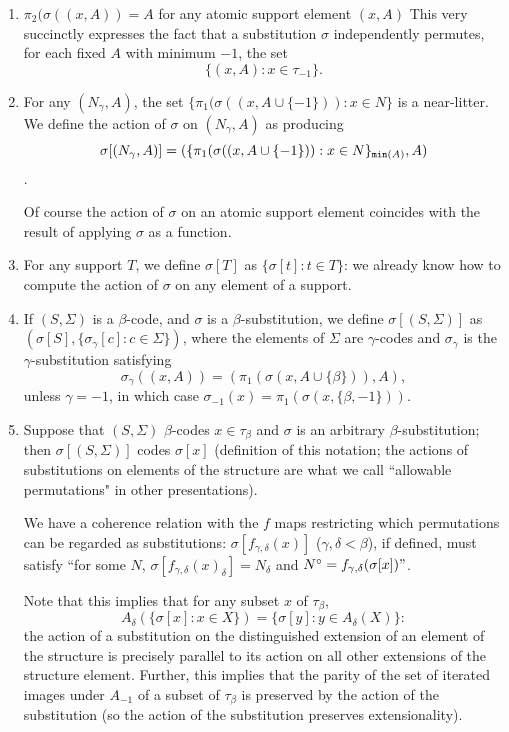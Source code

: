 \documentclass[12pt]{article}
\begin{document}
\begin{enumerate}
\begin{enumerate}
\item $\pi_2(\sigma((x,A)) = A$ for any atomic support element $(x,A)$  This very succinctly expresses the fact that a substitution $\sigma$ independently permutes, for each fixed $A$ with minimum $-1$, the set $$\{(x,A):x \in \tau_{-1}\}.$$

\item  For any $(N_\gamma,A)$, the set $\{\pi_1(\sigma((x,A\cup \{-1\})):x \in N\}$ is a near-litter.  We define the action of $\sigma$ on $(N_\gamma,A)$ as producing  $$\sigma[(N_\gamma,A)] = (\{\pi_1(\sigma((x,A\cup \{-1\})):x \in N\}_{{\tt min}(A)},A)$$.

Of course the action of $\sigma$ on an atomic support element coincides with the result of applying $\sigma$ as a function.

\item For any support $T$, we define $\sigma[T]$ as $\{\sigma[t]:t \in T\}$:  we already know how to compute the action of $\sigma$ on any element of a support.

\item  If $(S,\Sigma)$ is a $\beta$-code, and $\sigma$ is a $\beta$-substitution, we define $\sigma[(S,\Sigma)]$ as $(\sigma[S],\{\sigma_\gamma[c]:c \in \Sigma\})$, where the elements of $\Sigma$ are $\gamma$-codes and  $\sigma_{\gamma}$ is the $\gamma$-substitution satisfying $$\sigma_\gamma((x,A)) = (\pi_1(\sigma(x,A\cup \{\beta\})),A),$$ 
unless $\gamma=-1$, in which case $\sigma_{-1}(x) = \pi_1(\sigma(x,\{\beta,-1\}))$.

\item  Suppose that $(S,\Sigma)$ $\beta$-codes $x \in \tau_\beta$ and $\sigma$ is an arbitrary $\beta$-substitution;  then $\sigma[(S,\Sigma)]$ codes $\sigma[x]$ (definition of this notation;  the actions of substitutions on elements of the structure are what we call ``allowable permutations" in other presentations).  

We have a coherence relation with the $f$ maps restricting which permutations can be regarded as substitutions:  $\sigma[f_{\gamma,\delta}(x)]$ ($\gamma,\delta<\beta$), if defined, must  satisfy ``for some $N$, 
$\sigma[f_{\gamma,\delta}(x)_\delta] = N_\delta$ and $N^\circ = f_{\gamma,\delta}(\sigma[x])"$.  

Note that this implies that for any subset $x$ of $\tau_\beta$,
$$A_\delta(\{\sigma[x]:x \in X\}) = \{\sigma[y]:y \in A_\delta(X)\}:$$  the action of a substitution on the distinguished extension of an element of the structure is precisely parallel to its action on all other extensions of the structure element.  Further, this implies that the parity of the set of iterated images under $A_{-1}$ of a subset of $\tau_\beta$ is preserved by the action of the substitution (so the action of the substitution preserves extensionality).


\end{enumerate}
\end{enumerate}
\end{document}
